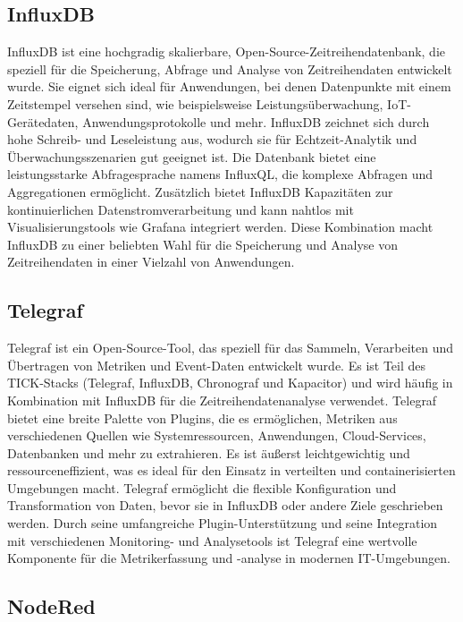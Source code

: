 \documentclass[a4paper, 12pt, oneside, toc=listofnumbered, bibliography=totoc]{scrbook}
\begin{document}
		\subsection{InfluxDB}
		
		InfluxDB ist eine hochgradig skalierbare, Open-Source-Zeitreihendatenbank, die speziell für die Speicherung, Abfrage und Analyse von Zeitreihendaten entwickelt wurde. Sie eignet sich ideal für Anwendungen, bei denen Datenpunkte mit einem Zeitstempel versehen sind, wie beispielsweise Leistungsüberwachung, IoT-Gerätedaten, Anwendungsprotokolle und mehr. InfluxDB zeichnet sich durch hohe Schreib- und Leseleistung aus, wodurch sie für Echtzeit-Analytik und Überwachungsszenarien gut geeignet ist. Die Datenbank bietet eine leistungsstarke Abfragesprache namens InfluxQL, die komplexe Abfragen und Aggregationen ermöglicht. Zusätzlich bietet InfluxDB Kapazitäten zur kontinuierlichen Datenstromverarbeitung und kann nahtlos mit Visualisierungstools wie Grafana integriert werden. Diese Kombination macht InfluxDB zu einer beliebten Wahl für die Speicherung und Analyse von Zeitreihendaten in einer Vielzahl von Anwendungen. \cite{noauthor_influxdb_2023}
		
		\subsection{Telegraf}
		
		Telegraf ist ein Open-Source-Tool, das speziell für das Sammeln, Verarbeiten und Übertragen von Metriken und Event-Daten entwickelt wurde. Es ist Teil des TICK-Stacks (Telegraf, InfluxDB, Chronograf und Kapacitor) und wird häufig in Kombination mit InfluxDB für die Zeitreihendatenanalyse verwendet. Telegraf bietet eine breite Palette von Plugins, die es ermöglichen, Metriken aus verschiedenen Quellen wie Systemressourcen, Anwendungen, Cloud-Services, Datenbanken und mehr zu extrahieren. Es ist äußerst leichtgewichtig und ressourceneffizient, was es ideal für den Einsatz in verteilten und containerisierten Umgebungen macht. Telegraf ermöglicht die flexible Konfiguration und Transformation von Daten, bevor sie in InfluxDB oder andere Ziele geschrieben werden. Durch seine umfangreiche Plugin-Unterstützung und seine Integration mit verschiedenen Monitoring- und Analysetools ist Telegraf eine wertvolle Komponente für die Metrikerfassung und -analyse in modernen IT-Umgebungen. \cite{noauthor_telegraf_2022}
		
		\subsection{NodeRed}
		
\end{document}
